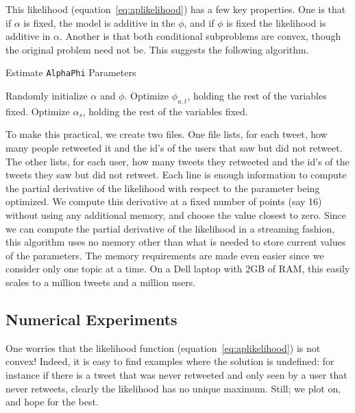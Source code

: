 This likelihood (equation~\eqref{eq:aplikelihood}) has a few key properties.  
One is that if $\alpha$ is fixed, the model is additive in the $\phi$, and if $\phi$ is fixed the likelihood is additive in $\alpha$.  
Another is that both conditional subproblems are convex, though the original problem need not be.  
This suggests the following algorithm.  
\begin{algorithm}
  \caption{Estimate \texttt{AlphaPhi} Parameters}
  \label{alg:apalg}

  \begin{algorithmic}
    \State Randomly initialize $\alpha$ and $\phi$.
    \State Optimize $\phi_{u,t}$, holding the rest of the variables fixed.  
    \EndFor
    \State Optimize $\alpha_s$, holding the rest of the variables fixed.  
    \EndFor
    \EndWhile
    \EndFor
  \end{algorithmic}
\end{algorithm}
  
To make this practical, we create two files.  
One file lists, for each tweet, how many people retweeted it and the id's of the users that saw but did not retweet.
The other lists, for each user, how many tweets they retweeted and the id's of the tweets they saw but did not retweet.
Each line is enough information to compute the partial derivative of the likelihood with respect to the parameter being optimized.
We compute this derivative at a fixed number of points (say 16) without using any additional memory, and choose the value closest to zero.
Since we can compute the partial derivative of the likelihood in a streaming fashion, this algorithm uses no memory other than what is needed to store current values of the parameters.
The memory requirements are made even easier since we consider only one topic at a time.  
On a Dell laptop with 2GB of RAM, this easily scales to a million tweets and a million users.  

\subsection{Numerical Experiments}

One worries that the likelihood function  (equation~\eqref{eq:aplikelihood}) is not convex!
Indeed, it is easy to find examples where the solution is undefined: for instance if there is a tweet that was never retweeted and only seen by a user that never retweets, clearly the likelihood has no unique maximum.
Still; we plot on, and hope for the best.

